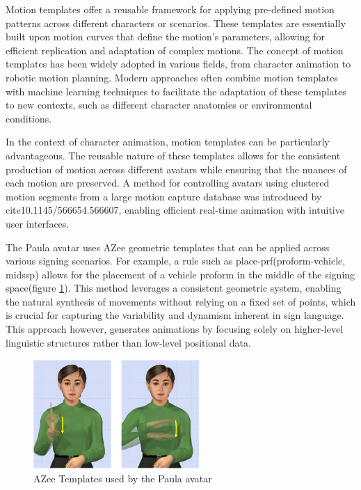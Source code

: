 \documentclass[../../main.tex]{subfiles}
\begin{document}
Motion templates offer a reusable framework for applying pre-defined motion patterns across different characters or scenarios. These templates are essentially built upon motion curves that define the motion's parameters, allowing for efficient replication and adaptation of complex motions. The concept of motion templates has been widely adopted in various fields, from character animation to robotic motion planning. Modern approaches often combine motion templates with machine learning techniques to facilitate the adaptation of these templates to new contexts, such as different character anatomies or environmental conditions.

In the context of character animation, motion templates can be particularly advantageous. The reusable nature of these templates allows for the consistent production of motion across different avatars while ensuring that the nuances of each motion are preserved. A method for controlling avatars using clustered motion segments from a large motion capture database was introduced by cite{10.1145/566654.566607}, enabling efficient real-time animation with intuitive user interfaces.

The Paula avatar uses AZee geometric templates that can be applied across various signing scenarios. For example, a rule such as place-prf(proform-vehicle, midssp) allows for the placement of a vehicle proform in the middle of the signing space(figure \ref{fig:azee_template_example}). This method leverages a consistent geometric system, enabling the natural synthesis of movements without relying on a fixed set of points, which is crucial for capturing the variability and dynamism inherent in sign language. This approach however, generates animations by focusing solely on higher-level linguistic structures rather than low-level positional data.

\begin{figure}
    \centering \includegraphics[width = 2.5in]{chapters/intermediate_blocks/images/azee_template_example.png}
    \caption{AZee Templates used by the Paula avatar}
    \label{fig:azee_template_example}
\end{figure}
\end{document}
